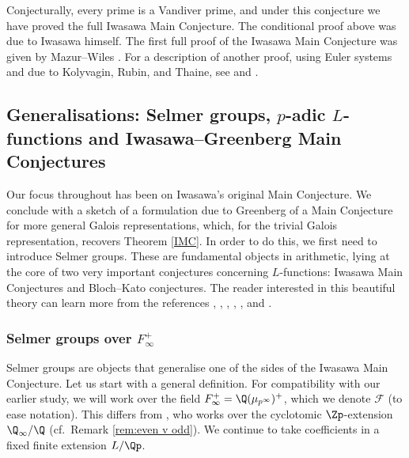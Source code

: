 \documentclass[a4paper,10pt, english, reqno]{smfart}
\newcommand{\cF}{\mathcal{F}}
\numberwithin{equation}{section}
\begin{document}
\begin{remark}
Conjecturally, every prime is a Vandiver prime, and under this conjecture we have proved the full Iwasawa Main Conjecture. %
The conditional proof above was due to Iwasawa himself. The first full proof of the Iwasawa Main Conjecture was given by Mazur--Wiles \cite{MW84}. For a description of another proof, using Euler systems and due to Kolyvagin, Rubin, and Thaine, see \cite{CS06} and \cite{Lan90}.
\end{remark}


\subsection{Generalisations: Selmer groups, $p$-adic $L$-functions and Iwasawa--Greenberg Main Conjectures} \label{sec:greenberg selmer}

Our focus throughout has been on Iwasawa's original Main Conjecture. We conclude with a sketch of a formulation due to Greenberg \cite{Gre89} of a Main Conjecture for more general Galois representations, which, for the trivial Galois representation, recovers Theorem \ref{IMC}. In order to do this, we first need to introduce Selmer groups. These are fundamental objects in arithmetic, lying at the core of two very important conjectures concerning $L$-functions: Iwasawa Main Conjectures and Bloch--Kato conjectures.  The reader interested in this beautiful theory can learn more from the  references \cite{Gre89}, \cite{Bel09},  \cite{Rub00}, \cite{Kat04}, \cite{PerrinRiou}, and \cite{Ski18}.




\subsubsection{Selmer groups over $F_\infty^+$}\label{sec:greenberg 1}

Selmer groups are objects that generalise one of the sides of the Iwasawa Main Conjecture. Let us start with a general definition. For compatibility with our earlier study, we will work over the field $F_\infty^+ = \Q(\mu_{p^{\infty}})^+$, which we denote $\cF$ (to ease notation). This differs from \cite{Gre89}, who works over the cyclotomic $\Zp$-extension $\Q_\infty/\Q$ (cf.\ Remark \ref{rem:even v odd}). We continue to take coefficients in a fixed finite extension $L/\Qp$.
\end{document}
